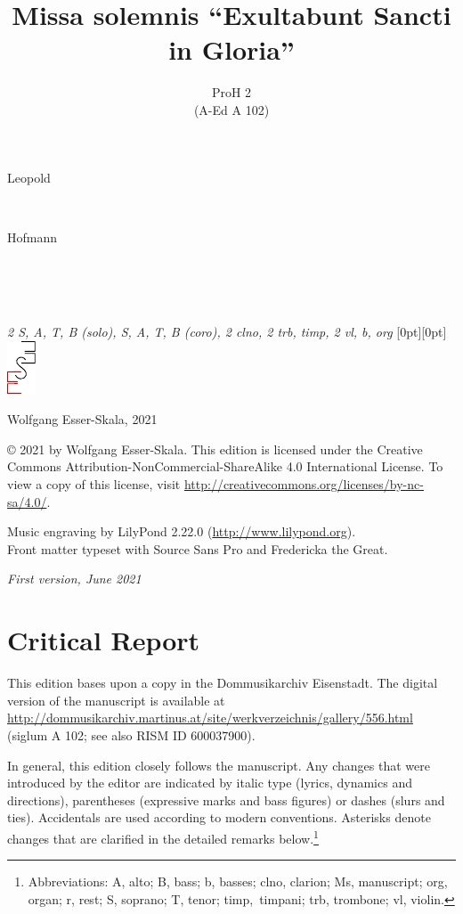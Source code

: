\documentclass[parskip=full]{scrreprt}
\makeatletter
\DeclareRobustCommand{\sbseries}{\fontseries{sb}\selectfont}
\newcommand\fancytitlehead{
  \headingfont%
  \fontsize{80}{80}\selectfont%
  \textcolor{black!80}{%
    \makebox[0pt][l]{\@ifundefined{@shortname}{\@lastname}{\@shortname}.}%
  }\\[15pt]%
  \fontsize{60}{60}\selectfont%
  \makebox[0pt][l]{\@ifundefined{@shorttitle}{\@title}{\@shorttitle}.}%
}
\def\firstname#1{\def\@firstname{#1}}
\def\lastname#1{\def\@lastname{#1}}
\def\shorttitle#1{\def\@shorttitle{#1}}
\def\scoring#1{\def\@scoring{#1}}
\def\maketitle{%
\begin{titlepage}%
  \Large%
  {\@titlehead}%
  \vfill%
  {\strut\@firstname}\\%
  {\sbseries\color{oldred}\strut\@lastname}\\%
  {\strut\@namesuffix}%
  \vfill%
  {\sbseries\@title}\\%
  {\@subtitle}\\[\baselineskip]%
  {\itshape\@scoring}%
  \vfill%
  {\itshape\@parts}\hspace*{\fill}\raisebox{0pt}[0pt][0pt]{\includegraphics{ees_logo}}%
\end{titlepage}%
}
\newif\ifprintreport\printreportfalse
\makeatother
\begin{document}
\frenchspacing

\titlehead{\fancytitlehead}
\firstname{Leopold}
\lastname{Hofmann}
\title{Missa solemnis “Exultabunt Sancti in Gloria”}
\shorttitle{Missa solemnis}
\subtitle{ProH 2\\(A-Ed A 102)}
\scoring{2 S, A, T, B (solo), S, A, T, B (coro), 2 clno, 2 trb, timp, 2 vl, b, org}
\maketitle


\thispagestyle{empty}

\vspace*{\fill}

\hspace*{1em}Wolfgang Esser-Skala, 2021

© 2021 by Wolfgang Esser-Skala. This edition is licensed under the Creative Commons Attribution-NonCommercial-ShareAlike 4.0 International License. To view a copy of this license, visit \url{http://creativecommons.org/licenses/by-nc-sa/4.0/}.

Music engraving by LilyPond 2.22.0 (\url{http://www.lilypond.org}).\\
Front matter typeset with Source Sans Pro and Fredericka the Great.

\textit{First version, June 2021}

\vspace*{2cm}

\ifprintreport
\chapter*{Critical Report}

This edition bases upon a copy in the Dommusikarchiv Eisenstadt. The digital version of the manuscript is available at \url{http://dommusikarchiv.martinus.at/site/werkverzeichnis/gallery/556.html} (siglum A 102; see also RISM ID 600037900).

In general, this edition closely follows the manuscript. Any changes that were introduced by the editor are indicated by italic type (lyrics, dynamics and directions), parentheses (expressive marks and bass figures) or dashes (slurs and ties). Accidentals are used according to modern conventions. Asterisks denote changes that are clarified in the detailed remarks below.\footnote{Abbreviations: A, alto; B, bass; b, basses; clno, clarion; Ms, manuscript; org, organ; r, rest; S, soprano; T, tenor; timp,~timpani; trb, trombone; vl, violin.}
\end{document}

